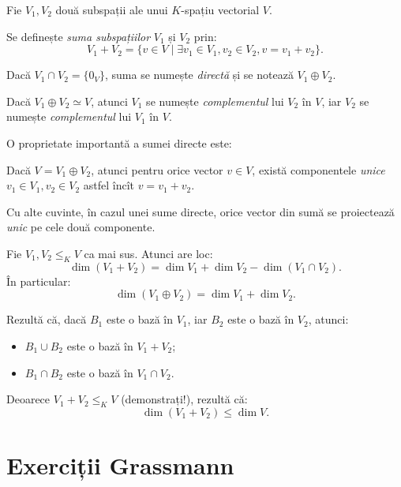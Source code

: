 Fie $ V_1, V_2 $ două subspații ale unui $ K $-spațiu vectorial $ V $.
\begin{definition}\label{def:suma-subsp}
  Se definește \emph{suma subspațiilor} $ V_1 $ și $ V_2 $ prin:
  \[
    V_1 + V_2 = \{ v \in V \mid \exists v_1 \in V_1, v_2 \in V_2, v = v_1 + v_2 \}.
  \]

  Dacă $ V_1 \cap V_2 = \{ 0_V \} $, suma se numește \emph{directă}
  și se notează $ V_1 \oplus V_2 $. 

  Dacă $ V_1 \oplus V_2 \simeq V $, atunci $ V_1 $ se numește \emph{complementul}
  lui $ V_2 $ în $ V $, iar $ V_2 $ se numește \emph{complementul} lui $ V_1 $
  în $ V $.
\end{definition}

O proprietate importantă a sumei directe este:
\begin{theorem}\label{thm:dir-proj}
  Dacă $ V = V_1 \oplus V_2 $, atunci pentru orice vector $ v \in V $,
  există componentele \emph{unice} $ v_1 \in V_1, v_2 \in V_2 $
  astfel încît $ v = v_1 + v_2 $.

  Cu alte cuvinte, în cazul unei sume directe, orice vector din sumă
  se proiectează \emph{unic} pe cele două componente.
\end{theorem}

\begin{theorem}[H.\ Grassmann]\label{thm:grass}
  Fie $ V_1, V_2 \leq_K V $ ca mai sus. Atunci are loc:
  \[
    \dim(V_1 + V_2) = \dim V_1 + \dim V_2 - \dim (V_1 \cap V_2).
  \]
  În particular:
  \[
    \dim (V_1 \oplus V_2) = \dim V_1 + \dim V_2.
  \]
\end{theorem}

Rezultă că, dacă $ B_1 $ este o bază în $ V_1 $, iar $ B_2 $ este o bază
în $ V_2 $, atunci:
\begin{itemize}
\item $ B_1 \cup B_2 $ este o bază în $ V_1 + V_2 $;
\item $ B_1 \cap B_2 $ este o bază în $ V_1 \cap V_2 $.
\end{itemize}

\begin{remark}\label{rk:dim-suma}
  Deoarece $ V_1 + V_2 \leq_K V $ (demonstrați!), rezultă că:
  \[
    \dim(V_1 + V_2) \leq \dim V.
  \]
\end{remark}


\section{Exerciții Grassmann}

